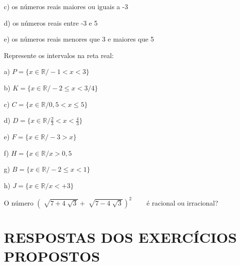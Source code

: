 \begin{exercicios}
\begin{multicols}{2}
		c) os números reais maiores ou iguais a -3
		
		d) os números reais entre -3 e 5

		e) os números reais menores que 3 e maiores que 5
	\end{multicols}

	\exitem{}  Represente os intervalos na reta real:
	\begin{multicols}{2}
	a) $P= \{ x \in {\mathbb{R} }/ -  1 < x < 3 \} $
	 
	b) $K= \{ x \in \mathbb{R} / - 2 \leq x < 3/4 \} $ 

	c) $C= \{ x \in \mathbb{R} /0, 5 < x \leq  5 \} $
	
	d) $D= \{ x \in \mathbb{R} / \frac{2}{3} < x < \frac{4}{3} \} $ 

	e) $F= \{ x \in \mathbb{R}/ - 3 > x \} $
	
	f) $H = \{ x \in \mathbb{R}/ x > 0, 5$ 

	g) $B= \{ x \in \mathbb{R} / - 2 \leq x < 1 \} $
	
	h) $J= \{ x \in \mathbb{R} / x < +3 \} $ 
\end{multicols}
	\exitem{} O número \(  \left( \sqrt[]{7+4\sqrt[]{3}}+\sqrt[]{7-4\sqrt[]{3}} \right) ^{2} \) ~~~ é racional ou irracional?
\end{exercicios}

\section{RESPOSTAS DOS EXERCÍCIOS PROPOSTOS}

